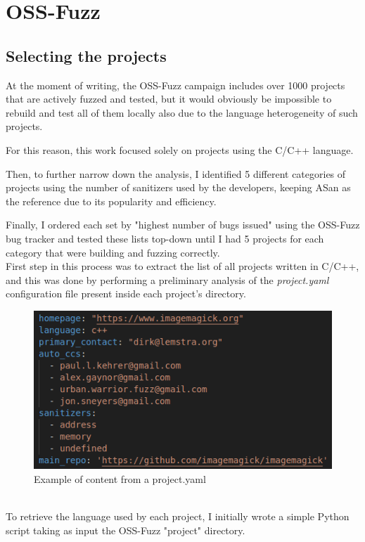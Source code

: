 \section{OSS-Fuzz}
\subsection{Selecting the projects} \label{selection}
At the moment of writing, the OSS-Fuzz campaign includes over 1000 projects that are actively fuzzed and tested, but it would obviously be impossible to rebuild and test all of them locally also due to the language heterogeneity of such projects.

For this reason, this work focused solely on projects using the C/C++ language.

Then, to further narrow down the analysis, I identified 5 different categories of projects using the number of sanitizers used by the developers, keeping ASan as the reference due to its popularity and efficiency.

Finally, I ordered each set by "highest number of bugs issued" using the OSS-Fuzz bug tracker and tested these lists top-down until I had 5 projects for each category that were building and fuzzing correctly.
\ \\ 
 

First step in this process was to extract the list of all projects written in C/C++, and this was done by performing a preliminary analysis of the \textit{project.yaml} configuration file present inside each project's directory.

\begin{figure}[h]
\centering
\includegraphics[scale=0.65]{foto/project_yaml.png}
\caption{Example of content from a project.yaml}
\label{fig:project_yaml}
\end{figure}
\ \\
To retrieve the language used by each project, I initially wrote a simple Python script taking as input the OSS-Fuzz "project" directory.

